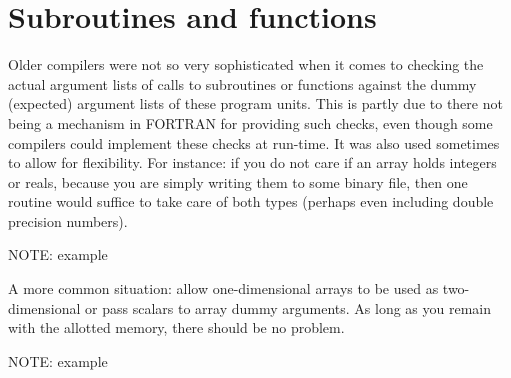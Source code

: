 \section{Subroutines and functions}
Older compilers were not so very sophisticated when it comes to checking the
actual argument lists of calls to subroutines or functions against the
dummy (expected) argument lists of these program units. This is partly due
to there not being a mechanism in FORTRAN for providing such checks, even though
some compilers could implement these checks at run-time. It was also used sometimes
to allow for flexibility. For instance: if you do not care if an array holds integers
or reals, because you are simply writing them to some binary file, then one
routine would suffice to take care of both types (perhaps even including double
precision numbers).

NOTE: example

A more common situation: allow one-dimensional arrays to be used as two-dimensional
or pass scalars to array dummy arguments. As long as you remain with the allotted
memory, there should be no problem.

NOTE: example

